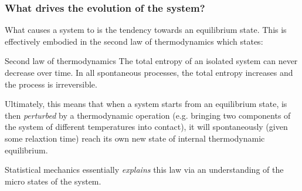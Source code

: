 \documentclass[hyperref={colorlinks=true}]{beamer}
\begin{document}
\begin{frame}%
  \frametitle{What drives the evolution of the system?}
  

  What causes a system to  is the tendency towards an equilibrium state. This is effectively embodied in the second law of thermodynamics which states:
  
  \pause
  
  \begin{ucblock}{Second law of thermodynamics}
    The total entropy of an isolated system can never decrease over time. In all spontaneous processes, the total entropy increases and the process is irreversible. 
  \end{ucblock}
  
  \pause
  
  Ultimately, this means that when a system starts from an equilibrium state, is then \textit{perturbed} by a thermodynamic operation (e.g. bringing two components of the system of different temperatures into contact), it will spontaneously (given some relaxtion time) reach its own new state of internal thermodynamic equilibrium.
  
  \vspace{0.3cm}
  
  Statistical mechanics essentially \textit{explains} this law via an understanding of the micro states of the system.

\end{frame}


\end{document}
